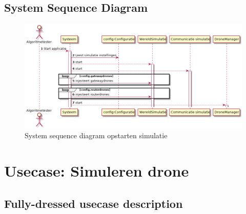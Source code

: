 \documentclass[a4paper, 11pt, oneside]{report}
\begin{document}
\label{Usecase:simulatiedronenetwerk:fully-dressed}
\subsection{System Sequence Diagram}
\label{Usecase:simulatiedronenetwerk:systemsequence}
\begin{figure}[H]
	\begin{center}\includegraphics[height=.3\textheight]{UML/out/usecase/sequence/SimulerenDronenetwerk/SimulerenDronenetwerk.png}\end{center}
	\caption{System sequence diagram opstarten simulatie}
	\label{fig:simulatiedronenetwerk:systemsequence}
\end{figure}


\section[Simuleren drone]{Usecase: Simuleren drone}
\label{Usecase:simulatiedrone}
\subsection{Fully-dressed usecase description}
\end{document}
